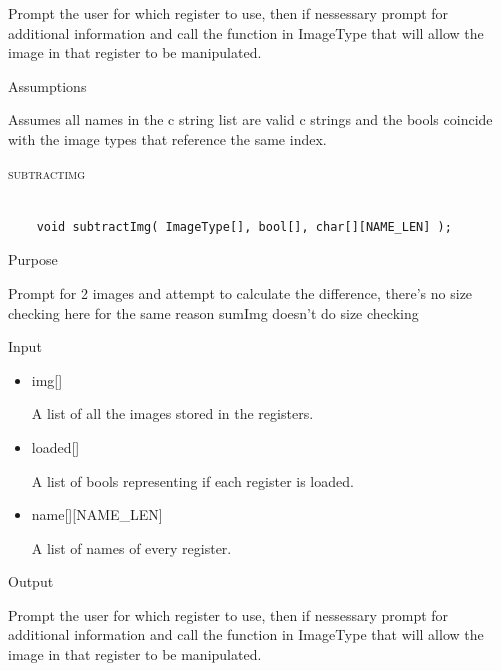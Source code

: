 \documentclass[pdftex, 11pt]{article}
\begin{document}
\begin{description}
\begin{description}
				Prompt the user for which register to use, then if nessessary
				prompt for additional information and call the function
				in ImageType that will allow the image in that register to
				be manipulated.

			\item{Assumptions}

				Assumes all names in the c string list are valid c
				strings and the bools coincide with the image types that
				reference the same index.

		\end{description}



	\item{\textsc{subtractimg}}

		\begin{lstlisting}

	void subtractImg( ImageType[], bool[], char[][NAME_LEN] );
		\end{lstlisting}

		\begin{description}
			\item{Purpose}

				Prompt for 2 images and attempt to calculate the difference, there's no size
				checking here for the same reason sumImg doesn't do size checking

			\item{Input}

				\begin{itemize}

					\item{img[]}

						A list of all the images stored in the registers.

					\item{loaded[]}

						A list of bools representing if each register is loaded.

					\item{name[][NAME\_LEN]}

						A list of names of every register.

				\end{itemize}

			\item{Output}

				Prompt the user for which register to use, then if nessessary
				prompt for additional information and call the function
				in ImageType that will allow the image in that register to
				be manipulated.


\end{description}
\end{description}
\end{document}
